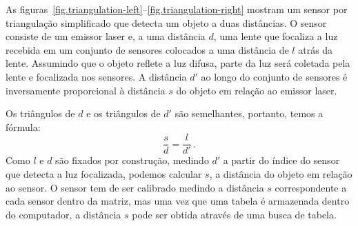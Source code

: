 
As figuras~\ref{fig.triangulation-left}--\ref{fig.triangulation-right} mostram um sensor por triangulação simplificado que detecta um objeto a duas distâncias. O sensor consiste de um emissor laser e, a uma distância $d$, uma lente que focaliza a luz recebida em um conjunto de sensores colocados a uma distância de $l$ atrás da lente. Assumindo que o objeto reflete a luz difusa, parte da luz será coletada pela lente e focalizada nos sensores. A distância $d'$ ao longo do conjunto de sensores é inversamente proporcional à distância $s$ do objeto em relação ao emissor laser.

Os triângulos de $d$ e os triângulos de $d'$ são semelhantes, portanto, temos a fórmula:
\[
\frac{s}{d} = \frac{l}{d'}\,.
\]
Como $l$ e $d$ são fixados por construção, medindo $d'$ a partir do índice do sensor que detecta a luz focalizada, podemos calcular $s$, a distância do objeto em relação ao sensor. O sensor tem de ser calibrado medindo a distância $s$ correspondente a cada sensor dentro da matriz, mas uma vez que uma tabela é armazenada dentro do computador, a distância $s$ pode ser obtida através de uma busca de tabela.


